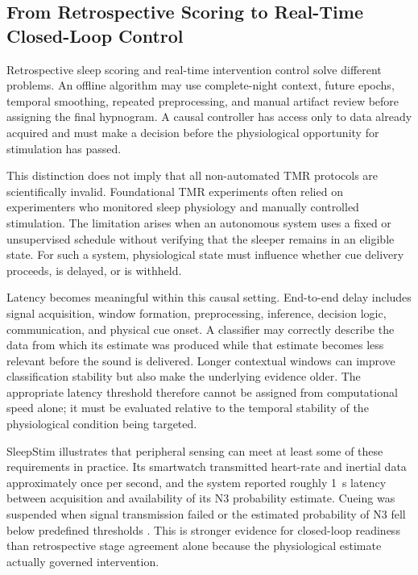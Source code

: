 \subsection{From Retrospective Scoring to Real-Time Closed-Loop Control}

Retrospective sleep scoring and real-time intervention control solve different
problems. An offline algorithm may use complete-night context, future epochs,
temporal smoothing, repeated preprocessing, and manual artifact review before
assigning the final hypnogram. A causal controller has access only to data
already acquired and must make a decision before the physiological opportunity
for stimulation has passed.

This distinction does not imply that all non-automated TMR protocols are
scientifically invalid. Foundational TMR experiments often relied on
experimenters who monitored sleep physiology and manually controlled
stimulation. The limitation arises when an autonomous system uses a fixed or
unsupervised schedule without verifying that the sleeper remains in an eligible
state. For such a system, physiological state must influence whether cue
delivery proceeds, is delayed, or is withheld.

Latency becomes meaningful within this causal setting. End-to-end delay includes
signal acquisition, window formation, preprocessing, inference, decision logic,
communication, and physical cue onset. A classifier may correctly describe the
data from which its estimate was produced while that estimate becomes less
relevant before the sound is delivered. Longer contextual windows can improve
classification stability but also make the underlying evidence older. The
appropriate latency threshold therefore cannot be assigned from computational
speed alone; it must be evaluated relative to the temporal stability of the
physiological condition being targeted.

SleepStim illustrates that peripheral sensing can meet at least some of these
requirements in practice. Its smartwatch transmitted heart-rate and inertial
data approximately once per second, and the system reported roughly 1~s latency
between acquisition and availability of its N3 probability estimate. Cueing was
suspended when signal transmission failed or the estimated probability of N3
fell below predefined thresholds
\citep{whitmore2022improving}. This is stronger evidence for closed-loop
readiness than retrospective stage agreement alone because the physiological
estimate actually governed intervention.

